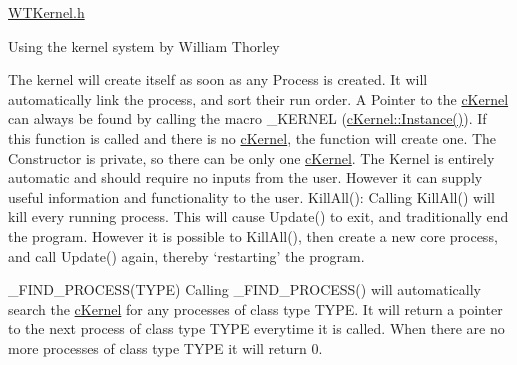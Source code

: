 \hyperlink{_w_t_kernel_8h_source}{WTKernel.h}

Using the kernel system by William Thorley

The kernel will create itself as soon as any Process is created. It will automatically link the process, and sort their run order. A Pointer to the \hyperlink{classc_kernel}{cKernel} can always be found by calling the macro \_\-KERNEL (\hyperlink{classc_kernel_a5bd65ef494632b9fd585a6f6cae375e7}{cKernel::Instance()}). If this function is called and there is no \hyperlink{classc_kernel}{cKernel}, the function will create one. The Constructor is private, so there can be only one \hyperlink{classc_kernel}{cKernel}. The Kernel is entirely automatic and should require no inputs from the user. However it can supply useful information and functionality to the user. KillAll(): Calling KillAll() will kill every running process. This will cause Update() to exit, and traditionally end the program. However it is possible to KillAll(), then create a new core process, and call Update() again, thereby ‘restarting’ the program.

\_\-FIND\_\-PROCESS(TYPE) Calling \_\-FIND\_\-PROCESS() will automatically search the \hyperlink{classc_kernel}{cKernel} for any processes of class type TYPE. It will return a pointer to the next process of class type TYPE everytime it is called. When there are no more processes of class type TYPE it will return 0. 